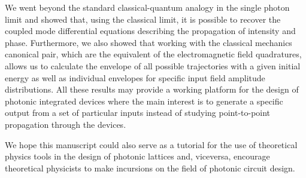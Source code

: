 \documentclass[9pt,twocolumn,twoside]{osajnl}
\begin{document}
We went beyond the standard classical-quantum analogy in the single photon limit and showed that, using the classical limit, it is possible to recover the coupled mode differential equations describing the propagation of intensity and phase.
Furthermore, we also showed that working with the classical mechanics canonical pair, which are the equivalent of the electromagnetic field quadratures, allows us to calculate the envelope of all possible trajectories with a given initial energy as well as individual envelopes for specific input field amplitude distributions.
All these results may provide a working platform for the design of photonic integrated devices where the main interest is to generate a specific output from a set of particular inputs instead of studying point-to-point propagation through the devices.


We hope this manuscript could also serve as a tutorial for the use of theoretical physics tools in the design of photonic lattices and, viceversa, encourage theoretical physicists to make incursions on the field of photonic circuit design.








%
%
\end{document}
